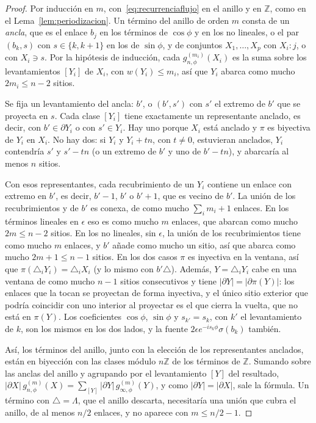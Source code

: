 \documentclass[11pt,a4paper]{article}
\theoremstyle{remark}
\begin{document}
\begin{proof}
Por inducción en $m$, con~\eqref{eq:recurrenciaflujo} en el anillo y en $\mathbb Z$, como en el
Lema~\ref{lem:periodizacion}. Un término del anillo de orden $m$ consta de un \emph{ancla}, que es el
enlace $b_j$ en los términos de $\cos\phi$ y en los no lineales, o el par $(b_k,s)$ con $s\in\{k,k{+}1\}$
en los de $\sin\phi$, y de conjuntos $X_1,\dots,X_p$ con $X_i:j$, o con $X_i\ni s$. Por la hipótesis de
inducción, cada $g_{n,\phi}^{(m_i)}(X_i)$ es la suma sobre los levantamientos $[Y_i]$ de $X_i$, con
$w(Y_i)\le m_i$, así que $Y_i$ abarca como mucho $2m_i\le n-2$ sitios.

Se fija un levantamiento del ancla: $b'$, o $(b',s')$ con $s'$ el extremo de $b'$ que se proyecta en
$s$. Cada clase $[Y_i]$ tiene exactamente un representante anclado, es decir, con $b'\in\partial Y_i$ o con
$s'\in Y_i$. Hay uno porque $X_i$ está anclado y $\pi$ es biyectiva de $Y_i$ en $X_i$. No hay dos: si
$Y_i$ y $Y_i+tn$, con $t\ne0$, estuvieran anclados, $Y_i$ contendría $s'$ y $s'-tn$ (o un extremo de $b'$ y
uno de $b'-tn$), y abarcaría al menos $n$ sitios.

Con esos representantes, cada recubrimiento de un $Y_i$ contiene un enlace con extremo en $b'$, es decir,
$b'-1$, $b'$ o $b'+1$, que es vecino de $b'$. La unión de los recubrimientos y de $b'$ es conexa, de
como mucho $\sum_im_i+1$ enlaces. En los términos lineales en $\epsilon$ eso es como mucho $m$ enlaces,
que abarcan como mucho $2m\le n-2$ sitios. En los no lineales, sin $\epsilon$, la unión de los
recubrimientos tiene como mucho $m$ enlaces, y $b'$ añade como mucho un sitio, así que abarca como mucho
$2m+1\le n-1$ sitios. En los dos casos $\pi$ es inyectiva en la ventana, así que
$\pi(\triangle_iY_i)=\triangle_iX_i$ (y lo mismo con $b'\triangle$). Además, $Y=\triangle_iY_i$ cabe en una
ventana de como mucho $n-1$ sitios consecutivos y tiene $|\partial Y|=|\partial\pi(Y)|$: los enlaces que la
tocan se proyectan de forma inyectiva, y el único sitio exterior que podría coincidir con uno interior al
proyectar es el que cierra la vuelta, que no está en $\pi(Y)$. Los coeficientes $\cos\phi$, $\sin\phi$ y
$s_{k'}=s_k$, con $k'$ el levantamiento de $k$, son los mismos en los dos lados, y la fuente
$2\epsilon e^{-is_k\phi}\sigma(b_k)$ también.

Así, los términos del anillo, junto con la elección de los representantes anclados, están en biyección
con las clases módulo $n\mathbb Z$ de los términos de $\mathbb Z$. Sumando sobre las anclas del anillo y
agrupando por el levantamiento $[Y]$ del resultado,
$|\partial X|\,g_{n,\phi}^{(m)}(X)=\sum_{[Y]}|\partial Y|\,g_{\infty,\phi}^{(m)}(Y)$, y como
$|\partial Y|=|\partial X|$, sale la fórmula. Un término con $\triangle=\Lambda$, que el anillo descarta,
necesitaría una unión que cubra el anillo, de al menos $n/2$ enlaces, y no aparece con
$m\le n/2-1$.
\end{proof}
\end{document}
